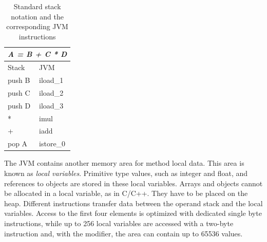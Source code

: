 \begin{table}[htbp]
    \centering
    \begin{tabular}{ll}
        \toprule
        \multicolumn{2}{c}{\emph{A = B + C * D}}  \\
        \midrule
        Stack & JVM \\
        \midrule
        push B& iload{\_}1 \\
        push C& iload{\_}2 \\
        push D& iload{\_}3 \\
        {*}   & imul \\
        +     & iadd \\
        pop A & istore{\_}0 \\
        \bottomrule
    \end{tabular}
    \caption{Standard stack notation and the corresponding
    JVM instructions}
    \label{tab_stack_not}
\end{table}

The JVM contains another memory area for method local data. This
area is known as \emph{local variables}. Primitive type values, such
as integer and float, and references to objects are stored in these
local variables. Arrays and objects cannot be allocated in a local
variable, as in C/C++. They have to be placed on the heap. Different
instructions transfer data between the operand stack and the local
variables. Access to the first four elements is optimized with
dedicated single byte instructions, while up to 256 local variables
are accessed with a two-byte instruction and, with the 
modifier, the area can contain up to 65536 values.

